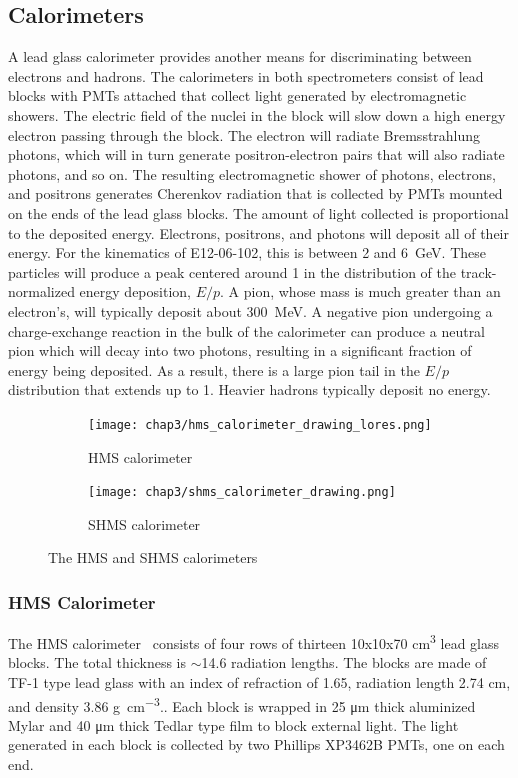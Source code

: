 \subsection{Calorimeters}
A lead glass calorimeter provides another means for discriminating between
electrons and hadrons.
The calorimeters in both spectrometers consist of lead blocks with
PMTs attached that collect light generated by electromagnetic showers.
The electric field of the nuclei in the block will slow down a high energy
electron passing through the block.
The electron will radiate Bremsstrahlung photons, which will in turn generate
positron-electron pairs that will also radiate photons, and so on.
The resulting electromagnetic shower of photons, electrons, and positrons
generates Cherenkov radiation that is collected by PMTs mounted on the ends
of the lead glass blocks.
The amount of light collected is proportional to the deposited energy.
Electrons, positrons, and photons will deposit all of their energy.
For the kinematics of E12-06-102, this is between 2 and
\SI{6}{\giga\electronvolt}.
These particles will produce a peak centered around 1 in the distribution of
the track-normalized energy deposition, $E/p$.
A pion, whose mass is much greater than an electron's, will typically deposit
about \SI{300}{\mega\electronvolt}.
A negative pion undergoing a charge-exchange reaction in the bulk of the
calorimeter can produce a neutral pion which will decay into two photons,
resulting in a significant fraction of energy being deposited.
As a result, there is a large pion tail in the $E/p$ distribution that extends
up to 1.
Heavier hadrons typically deposit no energy.

\begin{figure}[ht]
    \centering
    \begin{subfigure}[b]{0.35\textwidth}
        \centering
        \texttt{[image: chap3/hms\_calorimeter\_drawing\_lores.png]}
        \caption{HMS calorimeter}
        \label{fig:hms_calorimeter}
    \end{subfigure}
    \hfill
    \begin{subfigure}[b]{0.35\textwidth}
        \centering
        \texttt{[image: chap3/shms\_calorimeter\_drawing.png]}
        \caption{SHMS calorimeter}
        \label{fig:shms_calorimeter}
    \end{subfigure}
    \caption{The HMS and SHMS calorimeters}
    \label{fig:calorimeters}
\end{figure}

\subsubsection{HMS Calorimeter}
The HMS calorimeter~\cite{Mkrtchyan_2012} consists of four rows of thirteen
10x10x70 \si{\cm\cubed} lead glass blocks.
The total thickness is $\sim$14.6 radiation lengths.
The blocks are made of TF-1 type lead glass with an index of refraction of
1.65, radiation length 2.74 \si{cm}, and density 3.86 \si{\gram\per\cm\cubed}..
Each block is wrapped in 25 \si{\um} thick aluminized Mylar and 40
\si{\um} thick Tedlar type film to block external light.
The light generated in each block is collected by two Phillips XP3462B PMTs,
one on each end.

